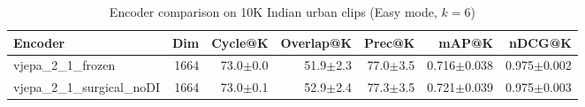 \begin{table}[ht]
\centering
\caption{Encoder comparison on 10K Indian urban clips (Easy mode, $k=6$)}
\label{tab:encoder_comparison}
\begin{tabular}{lrrrrrr}
\toprule
Encoder & Dim & Cycle@K & Overlap@K & Prec@K & mAP@K & nDCG@K \\
\midrule
vjepa\_2\_1\_frozen & 1664 & 73.0{\tiny$\pm$0.0} & 51.9{\tiny$\pm$2.3} & 77.0{\tiny$\pm$3.5} & 0.716{\tiny$\pm$0.038} & 0.975{\tiny$\pm$0.002} \\
vjepa\_2\_1\_surgical\_noDI & 1664 & 73.0{\tiny$\pm$0.1} & 52.9{\tiny$\pm$2.4} & 77.3{\tiny$\pm$3.5} & 0.721{\tiny$\pm$0.039} & 0.975{\tiny$\pm$0.003} \\
\bottomrule
\end{tabular}
\end{table}